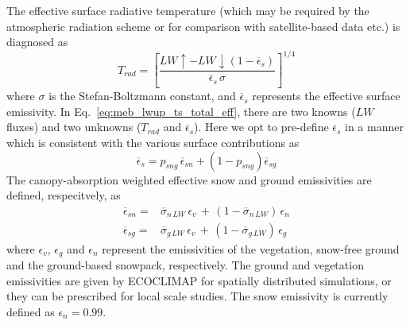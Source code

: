 The effective surface radiative temperature (which may be required by the atmospheric radiation
scheme or for comparison with satellite-based data etc.) 
is diagnosed as
%
\begin{equation}
  \label{eq:meb_lwup_ts_total_eff}
T_{rad} = {\left[\frac{LW\uparrow - LW\downarrow
      \left(1-{\overline\epsilon}_s\right)}
{{\overline\epsilon}_s \, \sigma}\right]}^{1/4}
%
\end{equation}
%
where $\sigma$ is the Stefan-Boltzmann constant, and 
${\overline\epsilon}_s$ represents
the effective surface emissivity. In Eq.~\ref{eq:meb_lwup_ts_total_eff},
there are two knowns ($LW$ fluxes) and two unknowns ($T_{rad}$ and
${\overline\epsilon}_s$). Here we opt to pre-define
${\overline\epsilon}_s$ in a manner which is consistent with the
various surface contributions as
%
\begin{equation}
  \label{eq:meb_emis_sfc_eff}
{\overline\epsilon}_s = p_{sng}\,{\overline\epsilon}_{sn} + \left( 1 - p_{sng}\right){\overline\epsilon}_{sg}
%
\end{equation}
%
The canopy-absorption weighted 
effective snow and ground emissivities are defined, respecitvely, as
%
\begin{align}
 \label{eq:meb_lw_emis_sfc_terms_n}
{\overline\epsilon}_{sn} = & 
        {\overline\sigma}_{n\,LW}       \,\epsilon_v \,+\, 
\left(1-{\overline\sigma}_{n\,LW}\right)\,\epsilon_n
\\
 \label{eq:meb_lw_emis_sfc_terms_g}
{\overline\epsilon}_{sg} = & 
        {\overline\sigma}_{g\,LW}       \,\epsilon_v \,+\, 
\left(1-{\overline\sigma}_{g\,LW}\right)\,\epsilon_g
%
\end{align}
%
where $\epsilon_v$, $\epsilon_g$ and $\epsilon_n$ represent 
the emissivities of the vegetation, snow-free ground and 
the ground-based snowpack, respectively. 
The ground and vegetation emissivities are given by ECOCLIMAP for
spatially distributed simulations, or they can be prescribed for local
scale studies. The snow emissivity is currently defined as $\epsilon_n=0.99$.
%
